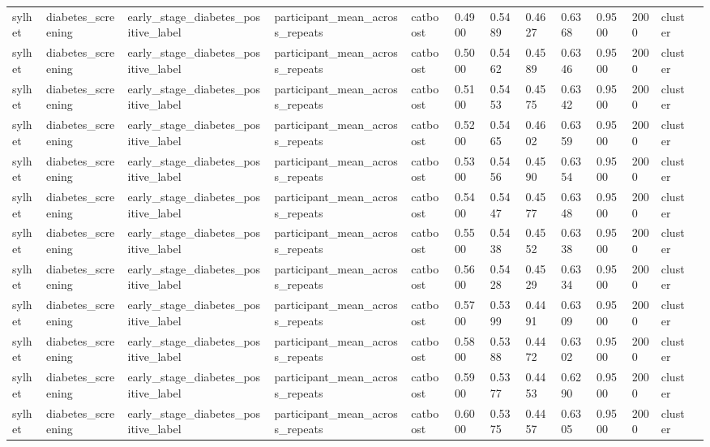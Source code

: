 \begin{tabular}{lllllllllllll}
sylhet & diabetes\_screening & early\_stage\_diabetes\_positive\_label & participant\_mean\_across\_repeats & catboost & 0.4900 & 0.5489 & 0.4627 & 0.6368 & 0.9500 & 2000 & cluster &  \\
sylhet & diabetes\_screening & early\_stage\_diabetes\_positive\_label & participant\_mean\_across\_repeats & catboost & 0.5000 & 0.5462 & 0.4589 & 0.6346 & 0.9500 & 2000 & cluster &  \\
sylhet & diabetes\_screening & early\_stage\_diabetes\_positive\_label & participant\_mean\_across\_repeats & catboost & 0.5100 & 0.5453 & 0.4575 & 0.6342 & 0.9500 & 2000 & cluster &  \\
sylhet & diabetes\_screening & early\_stage\_diabetes\_positive\_label & participant\_mean\_across\_repeats & catboost & 0.5200 & 0.5465 & 0.4602 & 0.6359 & 0.9500 & 2000 & cluster &  \\
sylhet & diabetes\_screening & early\_stage\_diabetes\_positive\_label & participant\_mean\_across\_repeats & catboost & 0.5300 & 0.5456 & 0.4590 & 0.6354 & 0.9500 & 2000 & cluster &  \\
sylhet & diabetes\_screening & early\_stage\_diabetes\_positive\_label & participant\_mean\_across\_repeats & catboost & 0.5400 & 0.5447 & 0.4577 & 0.6348 & 0.9500 & 2000 & cluster &  \\
sylhet & diabetes\_screening & early\_stage\_diabetes\_positive\_label & participant\_mean\_across\_repeats & catboost & 0.5500 & 0.5438 & 0.4552 & 0.6338 & 0.9500 & 2000 & cluster &  \\
sylhet & diabetes\_screening & early\_stage\_diabetes\_positive\_label & participant\_mean\_across\_repeats & catboost & 0.5600 & 0.5428 & 0.4529 & 0.6334 & 0.9500 & 2000 & cluster &  \\
sylhet & diabetes\_screening & early\_stage\_diabetes\_positive\_label & participant\_mean\_across\_repeats & catboost & 0.5700 & 0.5399 & 0.4491 & 0.6309 & 0.9500 & 2000 & cluster &  \\
sylhet & diabetes\_screening & early\_stage\_diabetes\_positive\_label & participant\_mean\_across\_repeats & catboost & 0.5800 & 0.5388 & 0.4472 & 0.6302 & 0.9500 & 2000 & cluster &  \\
sylhet & diabetes\_screening & early\_stage\_diabetes\_positive\_label & participant\_mean\_across\_repeats & catboost & 0.5900 & 0.5377 & 0.4453 & 0.6290 & 0.9500 & 2000 & cluster &  \\
sylhet & diabetes\_screening & early\_stage\_diabetes\_positive\_label & participant\_mean\_across\_repeats & catboost & 0.6000 & 0.5375 & 0.4457 & 0.6305 & 0.9500 & 2000 & cluster &  \\

\end{tabular}
